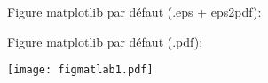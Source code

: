 \documentclass[12pt]{article}
\begin{document}
Figure matplotlib par défaut (.eps + eps2pdf):

\centerline{}	

\pagebreak

Figure matplotlib par défaut (.pdf):

\centerline{}	

\pagebreak

\noindent\texttt{[image: figmatlab1.pdf]}

\noindent{}

\noindent
\begin{minipage}{.48\textwidth}
   \centerline{}
\end{minipage} \hfill
\begin{minipage}{.48\textwidth}
   \centerline{}
\end{minipage}
\end{document}

